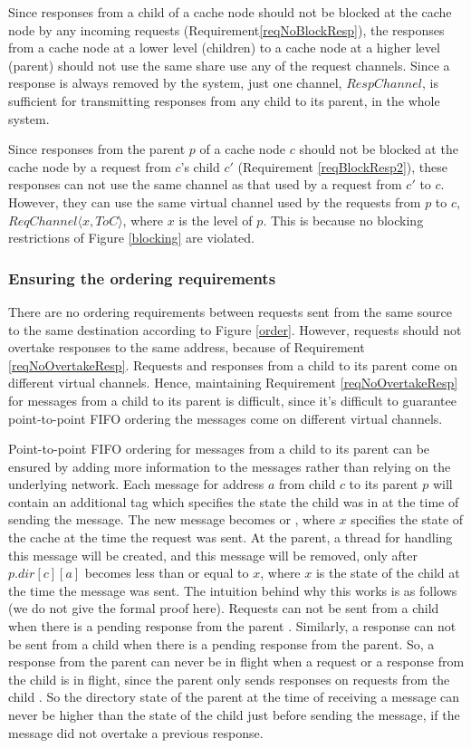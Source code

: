 Since responses from a child of a cache node should not be blocked at the cache
node by any incoming requests (Requirement\ref{reqNoBlockResp}), the responses
from a cache node at a lower level (children) to a cache node at a higher level
(parent) should not use the same share use any of the request channels. Since a
response is always removed by the system, just one channel, $RespChannel$, is
sufficient for transmitting responses from any child to its parent, in the
whole system.

Since responses from the parent $p$ of a cache node $c$ should not be blocked
at the cache node by a request from $c$'s child $c'$ (Requirement
\ref{reqBlockResp2}), these responses can not use the same channel as that used
by a request from $c'$ to $c$. However, they can use the same virtual channel
used by the requests from $p$ to $c$, $ReqChannel\langle x, ToC \rangle$, where
$x$ is the level of $p$. This is because no blocking restrictions of Figure
\ref{blocking} are violated.

\subsubsection{Ensuring the ordering requirements}
There are no ordering requirements between requests sent from the same source
to the same destination according to Figure \ref{order}.  However, requests
should not overtake responses to the same address, because of Requirement
\ref{reqNoOvertakeResp}. Requests and responses from a child to its parent come
on different virtual channels. Hence, maintaining Requirement
\ref{reqNoOvertakeResp} for messages from a child to its parent is difficult,
since it's difficult to guarantee point-to-point FIFO ordering the messages
come on different virtual channels.

Point-to-point FIFO ordering for messages from a child to its parent can be
ensured by adding more information to the messages rather than relying on the
underlying network. Each message for address $a$ from child $c$ to its parent
$p$ will contain an additional tag which specifies the state the child was in
at the time of sending the message. The new message becomes  or , where $x$ specifies the
state of the cache at the time the request was sent. At the parent, a thread
for handling this message will be created, and this message will be removed,
only after $p.dir[c][a]$ becomes less than or equal to $x$, where $x$ is the
state of the child at the time the message was sent. The intuition behind why
this works is as follows (we do not give the formal proof here). Requests can
not be sent from a child when there is a pending response from the parent
. Similarly, a response can not be sent from
a child when there is a pending response from the parent. So, a response from the parent can never be in flight
when a request or a response from the child is in flight, since the
parent only sends responses on requests from the child . So the directory state of the parent at the time of
receiving a message can never be higher than the state of the child just before
sending the message, if the message did not overtake a previous response.

